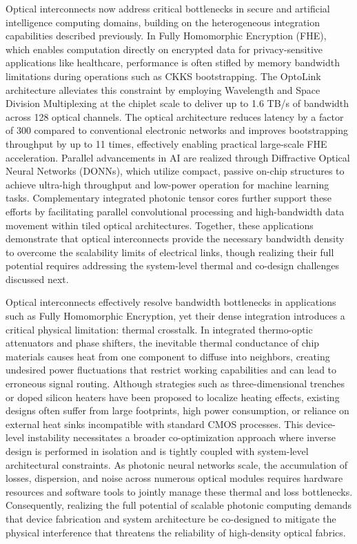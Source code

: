 Optical interconnects now address critical bottlenecks in secure and artificial intelligence computing domains, building on the heterogeneous integration capabilities described previously. In Fully Homomorphic Encryption (FHE), which enables computation directly on encrypted data for privacy-sensitive applications like healthcare, performance is often stifled by memory bandwidth limitations during operations such as CKKS bootstrapping. The OptoLink architecture alleviates this constraint by employing Wavelength and Space Division Multiplexing at the chiplet scale to deliver up to 1.6 TB/s of bandwidth across 128 optical channels. The optical architecture reduces latency by a factor of 300 compared to conventional electronic networks and improves bootstrapping throughput by up to 11 times, effectively enabling practical large-scale FHE acceleration. Parallel advancements in AI are realized through Diffractive Optical Neural Networks (DONNs), which utilize compact, passive on-chip structures to achieve ultra-high throughput and low-power operation for machine learning tasks. Complementary integrated photonic tensor cores further support these efforts by facilitating parallel convolutional processing and high-bandwidth data movement within tiled optical architectures. Together, these applications demonstrate that optical interconnects provide the necessary bandwidth density to overcome the scalability limits of electrical links, though realizing their full potential requires addressing the system-level thermal and co-design challenges discussed next. \citep{doi_10_1145_3806395_315ab915} \citep{doi_10_1002_nap2_70098_8d5f2f8a} \citep{doi_10_1515_nanoph_2022_0423_38a2c3ec}

Optical interconnects effectively resolve bandwidth bottlenecks in applications such as Fully Homomorphic Encryption, yet their dense integration introduces a critical physical limitation: thermal crosstalk. In integrated thermo-optic attenuators and phase shifters, the inevitable thermal conductance of chip materials causes heat from one component to diffuse into neighbors, creating undesired power fluctuations that restrict working capabilities and can lead to erroneous signal routing. Although strategies such as three-dimensional trenches or doped silicon heaters have been proposed to localize heating effects, existing designs often suffer from large footprints, high power consumption, or reliance on external heat sinks incompatible with standard CMOS processes. This device-level instability necessitates a broader co-optimization approach where inverse design is performed in isolation and is tightly coupled with system-level architectural constraints. As photonic neural networks scale, the accumulation of losses, dispersion, and noise across numerous optical modules requires hardware resources and software tools to jointly manage these thermal and loss bottlenecks. Consequently, realizing the full potential of scalable photonic computing demands that device fabrication and system architecture be co-designed to mitigate the physical interference that threatens the reliability of high-density optical fabrics. \citep{doi_10_1109_access_2020_3013116_8fec1fb2} \citep{doi_10_1145_3806395_315ab915} \citep{doi_10_3390_nano14080697_c372a140}

